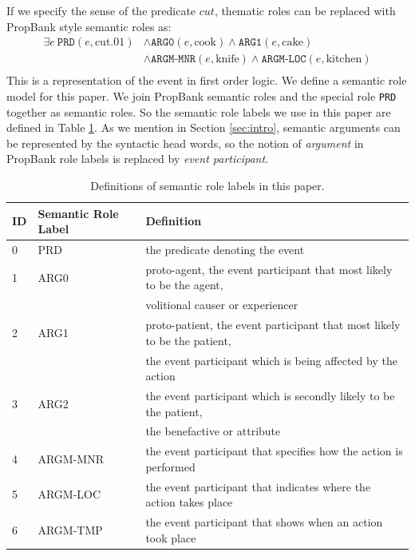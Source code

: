 \documentclass[a4paper]{article}
\begin{document}
If we specify the sense of the predicate $cut$, thematic roles can be replaced with PropBank style semantic roles as: 
\begin{equation*} \label{eg:symbolic-semantic}
\begin{aligned}
    \exists e\ \texttt{PRD}(e, \text{cut.01})
    & \land \texttt{ARG0}(e, \text{cook}) \land \texttt{ARG1}(e, \text{cake}) \\
    & \land \texttt{ARGM-MNR}(e, \text{knife}) \land \texttt{ARGM-LOC}(e, \text{kitchen}) \\
\end{aligned}
\end{equation*}
This is a representation of the event in first order logic. We define a semantic role model for this paper. We join PropBank semantic roles and the special role \texttt{PRD} together as semantic roles. So the semantic role labels we use in this paper are defined in Table \ref{tab:semantic}. As we mention in Section \ref{sec:intro}, semantic arguments can be represented by the syntactic head words, so the notion of \textit{argument} in PropBank role labels is replaced by \textit{event participant}. 
% 
% 

\begin{table}[t]
\centering
\begin{tabular}{l|l|l} 
\hline
\textbf{ID} &   \textbf{Semantic Role Label}    &   \textbf{Definition} \\  \hline
0           & PRD       &   the predicate denoting the event \\ \hline
1           & ARG0      &   proto-agent, the event participant that most likely to be the agent, \\     &&   volitional causer or experiencer \\ \hline
2           & ARG1      &   proto-patient, the event participant that most likely to be the patient, \\ &&   the event participant which is being affected by the action \\ \hline
3           & ARG2      &   the event participant which is secondly likely to be the patient,  \\       &&   the benefactive or attribute \\ \hline
4           & ARGM-MNR  &   the event participant that specifies how the action is performed \\ \hline
5           & ARGM-LOC  &   the event participant that indicates where the action takes place \\ \hline
6           & ARGM-TMP  &   the event participant that shows when an action took place \\ \hline
\end{tabular}
\caption{\label{tab:semantic} Definitions of semantic role labels in this paper.}
\end{table}
\end{document}
